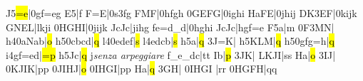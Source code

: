 \def\sfql#1{\usf{#1}\ql{#1}}%
\barre\Arpg J5\notes\soufflcr{}\hl{=e}|\qsoqb0gf{=e}g\enotes
\temps\arpg E5\notes{}\sfql a\sk|\zq f\sfql m\enotes
\temps\notes{}F{=E}|\Ilegu0s\dsoqb3fg\enotes
\barre\notes\zq F\ql M\sk{}F|\qsoqb0hfgh\enotes
\temps\notes\qsoqb0GEFG|\qsoqb0ighi\enotes
\barre\notes\zq H\ql a\sk{}FE|\qsoqb0jhij\enotes
\temps\notes\zq D\ql K\sk\dsoqb3EF|\qsoqb0kijk\enotes
\barre\notes\zq G\ql N\sk\zq E\ql L|lkji\enotes
\temps\notes\qsoqb0HGHI|\qsoqb0jijk\enotes
\barre\notes\zq J\ql c\sk\zq J\ql c|jihg\enotes
\temps\notes{}fe{=d}{_d}|\qsoqb0hghi\enotes
\barre\notes\zq J\ql c\sk\zq J\ql c|hgf{=e}\enotes
\temps\arpg F5\notes{}\ql a\sk|\ql m\enotes
\temps\notes\Ilegl0F\dqb3MN|\soupir\enotes
\barre\nspace\uarpg h4\notes{}\qqb0aNab|\hl o\enotes
\temps\uArpg h5\notes\qqb0cbcd|\hl q\enotes
\barre\nspace\uarpg l4\notes\qqb0edef|\hl s\enotes
\temps\uarpg l4\notes{}edcb|\hl s\enotes
\barre\nspace\uarpg h5\notes{}\ql a\sk|\hl q\enotes
\notes\dsoqb3J{=K}|\enotes
\temps\uArpg h5\notes{}KLM|\hl q\enotes
\barre\nspace\uArpg h5\notes\qboqb0gfg{=h}|\hl q\enotes
\temps\uArpg i4\notes{}gf{=e}d|\hl{=p}\enotes
\barre\nspace\uArpg h5\notes\zq J\ql c\sk{}|\hl q\enotes
\temps\notes\zcharnote j{\noteskip\it senza arpeggiare}\relax
{}f{_e}{_d}c|\ql t\sk{}\ql t\enotes
\barre\notes{}\zq I\ql b\sk|\hl p\enotes
\temps\notes\dsoqb3JK|\enotes
\temps\notes\Soufflcr{}LKJI|\ql s\sk{}\ql s\enotes
\barre\notes\zq H\ql a\sk|\hl o\enotes
\temps\notes\dsoqb3IJ|\enotes
\temps\notes\qsoqb0KJIK|\ql p\sk{}\ql p\enotes
\barre\notes\qsoqb0JIHJ|\hl o\enotes
\temps\notes\qsoqb0IHGI|\ql p\sk{}\ql p\sk\enotes
\barre\notes\soufflcr\zq H\ql a|\hl q\enotes
\temps\notes\dsoqb3GH|\enotes
\temps\notes{}\qsoqb0IHGI\relax
    |\ql r\sk{}\ql r\sk\enotes
\barre\notes\qsoqb0HGFH|\ql q\sk{}\ql q\sk\enotes
